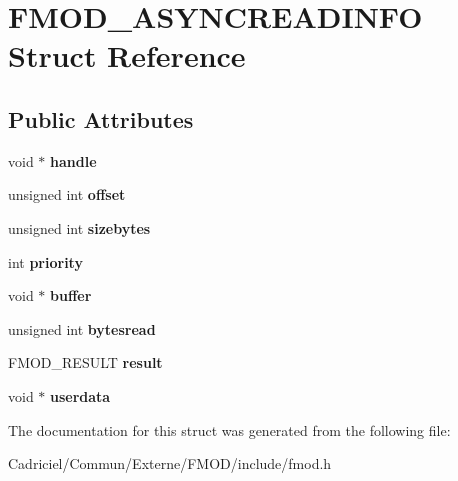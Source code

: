 \hypertarget{struct_f_m_o_d___a_s_y_n_c_r_e_a_d_i_n_f_o}{}\section{F\+M\+O\+D\+\_\+\+A\+S\+Y\+N\+C\+R\+E\+A\+D\+I\+N\+FO Struct Reference}
\label{struct_f_m_o_d___a_s_y_n_c_r_e_a_d_i_n_f_o}
\subsection*{Public Attributes}
\begin{DoxyCompactItemize}
\item 
void $\ast$ {\bfseries handle}\hypertarget{struct_f_m_o_d___a_s_y_n_c_r_e_a_d_i_n_f_o_a31e2e01864e3c97844a252f947ff8040}{}\label{struct_f_m_o_d___a_s_y_n_c_r_e_a_d_i_n_f_o_a31e2e01864e3c97844a252f947ff8040}

\item 
unsigned int {\bfseries offset}\hypertarget{struct_f_m_o_d___a_s_y_n_c_r_e_a_d_i_n_f_o_a8d42cc77cd8ef0559a666038e02a8807}{}\label{struct_f_m_o_d___a_s_y_n_c_r_e_a_d_i_n_f_o_a8d42cc77cd8ef0559a666038e02a8807}

\item 
unsigned int {\bfseries sizebytes}\hypertarget{struct_f_m_o_d___a_s_y_n_c_r_e_a_d_i_n_f_o_a19cda62a563d8b9c3116411c13d207f6}{}\label{struct_f_m_o_d___a_s_y_n_c_r_e_a_d_i_n_f_o_a19cda62a563d8b9c3116411c13d207f6}

\item 
int {\bfseries priority}\hypertarget{struct_f_m_o_d___a_s_y_n_c_r_e_a_d_i_n_f_o_aae5a4b76307bec7a0132b3abb04ab823}{}\label{struct_f_m_o_d___a_s_y_n_c_r_e_a_d_i_n_f_o_aae5a4b76307bec7a0132b3abb04ab823}

\item 
void $\ast$ {\bfseries buffer}\hypertarget{struct_f_m_o_d___a_s_y_n_c_r_e_a_d_i_n_f_o_a2154c0c4825d5f133e0b14ca1b94b324}{}\label{struct_f_m_o_d___a_s_y_n_c_r_e_a_d_i_n_f_o_a2154c0c4825d5f133e0b14ca1b94b324}

\item 
unsigned int {\bfseries bytesread}\hypertarget{struct_f_m_o_d___a_s_y_n_c_r_e_a_d_i_n_f_o_acef1543320ee49d5c723ce1dbd58e43b}{}\label{struct_f_m_o_d___a_s_y_n_c_r_e_a_d_i_n_f_o_acef1543320ee49d5c723ce1dbd58e43b}

\item 
F\+M\+O\+D\+\_\+\+R\+E\+S\+U\+LT {\bfseries result}\hypertarget{struct_f_m_o_d___a_s_y_n_c_r_e_a_d_i_n_f_o_a85e0137ab5748fbbd7ffee359823f57e}{}\label{struct_f_m_o_d___a_s_y_n_c_r_e_a_d_i_n_f_o_a85e0137ab5748fbbd7ffee359823f57e}

\item 
void $\ast$ {\bfseries userdata}\hypertarget{struct_f_m_o_d___a_s_y_n_c_r_e_a_d_i_n_f_o_a8a273751e70e26c1a51540a18269eecc}{}\label{struct_f_m_o_d___a_s_y_n_c_r_e_a_d_i_n_f_o_a8a273751e70e26c1a51540a18269eecc}

\end{DoxyCompactItemize}


The documentation for this struct was generated from the following file\+:\begin{DoxyCompactItemize}
\item 
Cadriciel/\+Commun/\+Externe/\+F\+M\+O\+D/include/fmod.\+h\end{DoxyCompactItemize}
